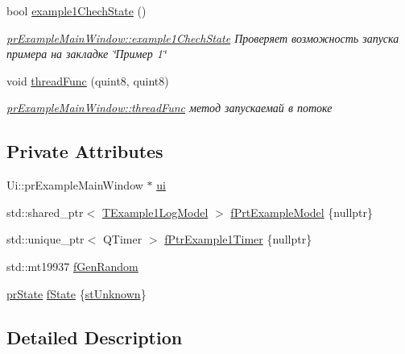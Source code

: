 \begin{DoxyCompactItemize}
bool \hyperlink{classpr_example_main_window_a242f1253935a9602cd56d79611790d6f}{example1\+Chech\+State} ()
\begin{DoxyCompactList}\small\item\em \hyperlink{classpr_example_main_window_a242f1253935a9602cd56d79611790d6f}{pr\+Example\+Main\+Window\+::example1\+Chech\+State} Проверяет возможность запуска примера на закладке \char`\"{}Пример 1\char`\"{} \end{DoxyCompactList}\item 
void \hyperlink{classpr_example_main_window_a65103d7c51e146ffa3f99d999312e38a}{thread\+Func} (quint8, quint8)
\begin{DoxyCompactList}\small\item\em \hyperlink{classpr_example_main_window_a65103d7c51e146ffa3f99d999312e38a}{pr\+Example\+Main\+Window\+::thread\+Func} метод запускаемай в потоке \end{DoxyCompactList}\end{DoxyCompactItemize}
\subsection*{Private Attributes}
\begin{DoxyCompactItemize}
\item 
Ui\+::pr\+Example\+Main\+Window $\ast$ \hyperlink{classpr_example_main_window_a834d83295e9242720576962487363786}{ui}
\item 
std\+::shared\+\_\+ptr$<$ \hyperlink{class_t_example1_log_model}{T\+Example1\+Log\+Model} $>$ \hyperlink{classpr_example_main_window_a84daab325be29ff2752e7237495b6ea6}{f\+Prt\+Example\+Model} \{nullptr\}
\item 
std\+::unique\+\_\+ptr$<$ Q\+Timer $>$ \hyperlink{classpr_example_main_window_ac1eb03a4265e3a97107cb98958915026}{f\+Ptr\+Example1\+Timer} \{nullptr\}
\item 
std\+::mt19937 \hyperlink{classpr_example_main_window_a269d30d2d31fe7d0893850776e10888f}{f\+Gen\+Random}
\item 
\hyperlink{classpr_example_main_window_ac6ea07691b05604b1dda8ec6263c028c}{pr\+State} \hyperlink{classpr_example_main_window_af1e816ef2265cf59efcb65f59a16cc7d}{f\+State} \{\hyperlink{classpr_example_main_window_ac6ea07691b05604b1dda8ec6263c028ca2d9733465da996ba5c35c393c9d2880e}{st\+Unknown}\}
\end{DoxyCompactItemize}


\subsection{Detailed Description}


